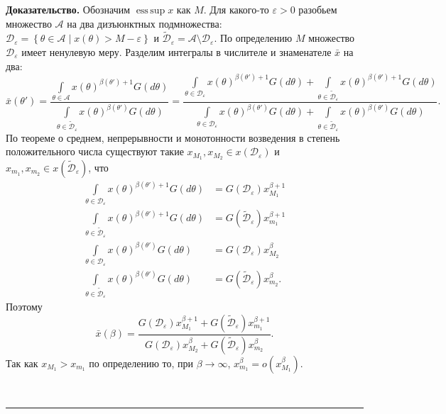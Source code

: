 \documentclass[12pt]{article}
\newenvironment{proof}[1][Доказательство]{\noindent\textbf{#1.} }{\ \rule{0.5em}{0.5em}}
\DeclareMathOperator*{\esssup}{ess\,sup}
\begin{document}
\begin{proof}
Обозначим $\esssup x$ как $M$.   Для какого-то $\varepsilon > 0$ разобьем множество $\mathcal{A}$ на два дизъюнктных подмножества: 
$\mathcal{D}_\varepsilon = \left\{ \theta \in \mathcal{A} \mid x(\theta) > M - \varepsilon \right\}$
и 
$ \widetilde{\mathcal{D}}_\varepsilon = \mathcal{A} \setminus \mathcal{D}_\varepsilon.$
По определению $M$ множество $\mathcal{D}_\varepsilon$ имеет ненулевую меру.
Разделим интегралы в числителе и знаменателе $\bar{x}$ на два:
\begin{equation*}
\bar{x}(\theta') = 
\frac{\int\limits_{\theta \in \mathcal{A}}x(\theta)^{\beta(\theta')+1}G(d \theta)}{\int\limits_{\theta \in \widetilde{\mathcal{D}}_\varepsilon} x(\theta)^{\beta(\theta')}G(d \theta)} = 
\frac{\int\limits_{\theta \in \mathcal{D}_\varepsilon}x(\theta)^{\beta(\theta')+1}G(d \theta) + \int\limits_{\theta \in \widetilde{\mathcal{D}}_\varepsilon}x(\theta)^{\beta(\theta')+1}G(d \theta)}{\int\limits_{\theta \in \mathcal{D}_\varepsilon} x(\theta)^{\beta(\theta')}G(d \theta) + \int\limits_{\theta \in \widetilde{\mathcal{D}}_\varepsilon} x(\theta)^{\beta(\theta')}G(d \theta)}.
\end{equation*}
По теореме о среднем,  непрерывности и монотонности возведения в степень положительного числа существуют такие $x_{M_1},  x_{M_2} \in x(\mathcal{D}_\varepsilon)$ и $x_{m_1}, x_{m_2} \in x(\widetilde{\mathcal{D}}_\varepsilon)$,  что
\begin{align*}
\int\limits_{\theta \in \mathcal{D}_\varepsilon}x(\theta)^{\beta(\theta')+1}G(d \theta) &= G(\mathcal{D}_\varepsilon) x_{M_1}^{\beta + 1}  \\
\int\limits_{\theta \in \widetilde{\mathcal{D}}_\varepsilon}x(\theta)^{\beta(\theta')+1}G(d \theta) &= G(\widetilde{\mathcal{D}}_\varepsilon) x_{m_1}^{\beta+1}\\
\int\limits_{\theta \in \mathcal{D}_\varepsilon}x(\theta)^{\beta(\theta')}G(d \theta) &= G(\mathcal{D}_\varepsilon) x_{M_2}^{\beta}  \\
\int\limits_{\theta \in \widetilde{\mathcal{D}}_\varepsilon}x(\theta)^{\beta(\theta')}G(d \theta) &= G(\widetilde{\mathcal{D}}_\varepsilon) x_{m_2}^{\beta}.
\end{align*}
Поэтому 
\begin{equation*}
\bar{x}(\beta) = \frac{G(\mathcal{D}_\varepsilon) x_{M_1}^{\beta + 1} + G(\widetilde{\mathcal{D}}_\varepsilon) x_{m_1}^{\beta+1}}{G(\mathcal{D}_\varepsilon) x_{M_2}^{\beta} + G(\widetilde{\mathcal{D}}_\varepsilon) x_{m_2}^{\beta}}.
\end{equation*}
Так как $x_{M_1} > x_{m_1}$ по определению то,  при $\beta \to \infty$,  $x_{m_1}^\beta = o(x_{M_1}^\beta). $ 

\end{proof}
\end{document}
